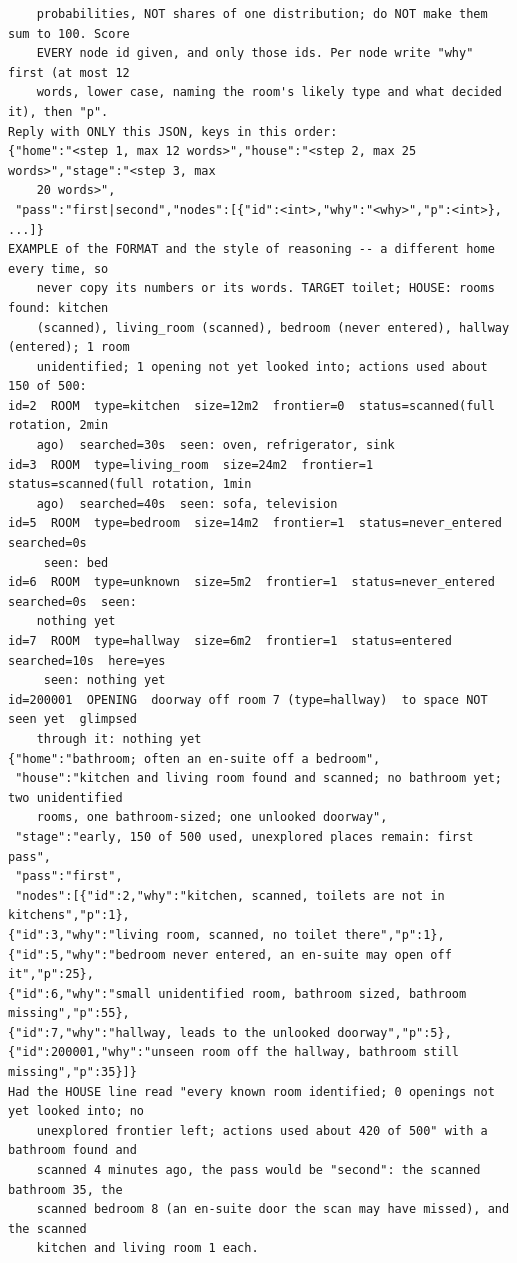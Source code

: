 \documentclass[10pt]{article}
\begin{document}
\begin{small}
\begin{verbatim}
    probabilities, NOT shares of one distribution; do NOT make them sum to 100. Score
    EVERY node id given, and only those ids. Per node write "why" first (at most 12
    words, lower case, naming the room's likely type and what decided it), then "p".
Reply with ONLY this JSON, keys in this order:
{"home":"<step 1, max 12 words>","house":"<step 2, max 25 words>","stage":"<step 3, max
    20 words>",
 "pass":"first|second","nodes":[{"id":<int>,"why":"<why>","p":<int>}, ...]}
EXAMPLE of the FORMAT and the style of reasoning -- a different home every time, so
    never copy its numbers or its words. TARGET toilet; HOUSE: rooms found: kitchen
    (scanned), living_room (scanned), bedroom (never entered), hallway (entered); 1 room
    unidentified; 1 opening not yet looked into; actions used about 150 of 500:
id=2  ROOM  type=kitchen  size=12m2  frontier=0  status=scanned(full rotation, 2min
    ago)  searched=30s  seen: oven, refrigerator, sink
id=3  ROOM  type=living_room  size=24m2  frontier=1  status=scanned(full rotation, 1min
    ago)  searched=40s  seen: sofa, television
id=5  ROOM  type=bedroom  size=14m2  frontier=1  status=never_entered  searched=0s
     seen: bed
id=6  ROOM  type=unknown  size=5m2  frontier=1  status=never_entered  searched=0s  seen:
    nothing yet
id=7  ROOM  type=hallway  size=6m2  frontier=1  status=entered  searched=10s  here=yes
     seen: nothing yet
id=200001  OPENING  doorway off room 7 (type=hallway)  to space NOT seen yet  glimpsed
    through it: nothing yet
{"home":"bathroom; often an en-suite off a bedroom",
 "house":"kitchen and living room found and scanned; no bathroom yet; two unidentified
    rooms, one bathroom-sized; one unlooked doorway",
 "stage":"early, 150 of 500 used, unexplored places remain: first pass",
 "pass":"first",
 "nodes":[{"id":2,"why":"kitchen, scanned, toilets are not in kitchens","p":1},
{"id":3,"why":"living room, scanned, no toilet there","p":1},
{"id":5,"why":"bedroom never entered, an en-suite may open off it","p":25},
{"id":6,"why":"small unidentified room, bathroom sized, bathroom missing","p":55},
{"id":7,"why":"hallway, leads to the unlooked doorway","p":5},
{"id":200001,"why":"unseen room off the hallway, bathroom still missing","p":35}]}
Had the HOUSE line read "every known room identified; 0 openings not yet looked into; no
    unexplored frontier left; actions used about 420 of 500" with a bathroom found and
    scanned 4 minutes ago, the pass would be "second": the scanned bathroom 35, the
    scanned bedroom 8 (an en-suite door the scan may have missed), and the scanned
    kitchen and living room 1 each.
\end{verbatim}
\end{small}
\end{document}
